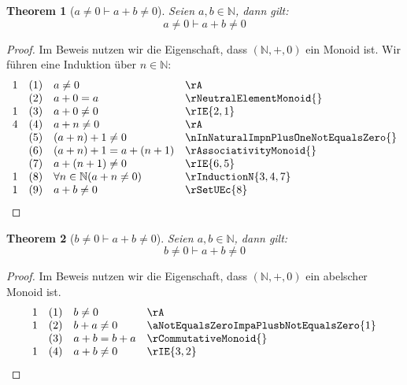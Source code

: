 \documentclass{book}
\theoremstyle{plain}
\newtheorem{theorem}{Theorem}
\theoremstyle{remark}
\theoremstyle{definition}
\begin{document}
\label{aNotEqualsZeroImpaPlusbNotEqualsZero}
\begin{theorem}[\(a\neq 0\vdash a+b\neq 0\)]
Seien \(a,b\in\mathbb{N}\), dann gilt:
\[a\neq 0\vdash a+b\neq 0\]
\end{theorem}
\begin{proof}
Im Beweis nutzen wir die Eigenschaft, dass \((\mathbb{N},+,0)\) ein Monoid ist. Wir führen eine Induktion über \(n\in\mathbb{N}\):
        \[
	\begin{array}{llll}
            1       &  (1)  & a\neq 0 & \rA \\
                    &  (2)  & a+0=a & \rNeutralElementMonoid{} \\
            1       &  (3)  & a+0\neq 0 & \rIE{2,1} \\
            4       &  (4)  & a+n\neq 0 & \rA \\
                    &  (5)  & (a+n)+1\neq 0 & \nInNaturalImpnPlusOneNotEqualsZero{} \\       
                    &  (6)  & (a+n)+1=a+(n+1) & \rAssociativityMonoid{} \\      
                    &  (7)  & a+(n+1)\neq 0 & \rIE{6,5} \\     
            1       &  (8)  & \forall n\in\mathbb{N}(a+n\neq 0) & \rInductionN{3,4,7} \\  
            1       &  (9)  & a+b\neq 0 & \rSetUEc{8} \\  
	\end{array}
	\]
\end{proof}

\label{bNotEqualsZeroImpaPlusbNotEqualsZero}
\begin{theorem}[\(b\neq 0\vdash a+b\neq 0\)]
Seien \(a,b\in\mathbb{N}\), dann gilt:
\[b\neq 0\vdash a+b\neq 0\]
\end{theorem}
\begin{proof}
Im Beweis nutzen wir die Eigenschaft, dass \((\mathbb{N},+,0)\) ein abelscher Monoid ist. 
        \[
	\begin{array}{llll}
            1       &  (1)  & b\neq 0 & \rA \\
            1       &  (2)  & b+a\neq 0 & \aNotEqualsZeroImpaPlusbNotEqualsZero{1} \\
                    &  (3)  & a+b=b+a & \rCommutativeMonoid{} \\
            1       &  (4)  & a+b\neq 0 & \rIE{3,2} \\
	\end{array}
	\]
\end{proof}
\end{document}
